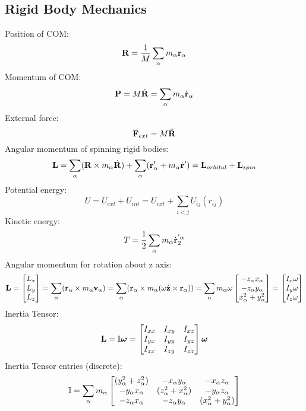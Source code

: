 \subsection{Rigid Body Mechanics}
Position of COM:
\begin{equation}
    \mathbf{R} = \frac{1}{M}\sum_\alpha m_\alpha\mathbf{r}_\alpha
\end{equation}
Momentum of COM:
\begin{equation}
    \mathbf{P} = M\dot{\mathbf{R}} = \sum_\alpha m_\alpha \dot{\mathbf{r}}_\alpha
\end{equation}
External force:
\begin{equation}
    \mathbf{F}_{ext} = M\ddot{\mathbf{R}}
\end{equation}
Angular momentum of spinning rigid bodies:
\begin{equation}
    \mathbf{L} = \sum_\alpha (\mathbf{R} \times m_\alpha\dot{\mathbf{R}}) + \sum_\alpha (\mathbf{r}'_\alpha + m_\alpha\dot{\mathbf{r}}') = \mathbf{L}_{orbital} + \mathbf{L}_{spin}
\end{equation}
Potential energy:
\begin{equation}
    U = U_{ext} + U_{int} = U_{ext} + \sum_{i<j}U_{ij}(r_{ij})
\end{equation}
Kinetic energy:
\begin{equation}
    T = \frac{1}{2}\sum_\alpha m_\alpha \dot{\mathbf{r}}^{'\alpha}_2
\end{equation}
Angular momentum for rotation about z axis:
\begin{equation}
    \mathbf{L} = \begin{bmatrix}L_x \\ L_y \\ L_z\end{bmatrix} = \sum_\alpha (\mathbf{r}_{\alpha} \times m_\alpha\mathbf{v}_\alpha) = \sum_\alpha (\mathbf{r}_{\alpha} \times m_\alpha(\omega\hat{\mathbf{z}} \times \mathbf{r}_\alpha)) = \sum_\alpha m_\alpha\omega\begin{bmatrix}-z_\alpha x_\alpha \\ -z_\alpha y_\alpha \\ x_\alpha^2 + y_\alpha^2\end{bmatrix} = \begin{bmatrix}I_x \omega \\ I_{y}\omega \\ I_z \omega\end{bmatrix}
\end{equation}
Inertia Tensor:
\begin{equation}
    \mathbf{L} = \mathbb{I} \bm{\omega} = \begin{bmatrix}I_{xx} & I_{xy} & I_{xz} \\ I_{yx} & I_{yy} & I_{yz} \\ I_{zx} & I_{zy} & I_{zz}\end{bmatrix}\bm{\omega}
\end{equation}
Inertia Tensor entries (discrete):
\[\mathbb{I} = \sum_\alpha m_\alpha \begin{bmatrix}(y_\alpha^2 + z_\alpha^2) & - x_\alpha y_\alpha & -x_\alpha z_\alpha
\\ -y_\alpha x_\alpha & (z_\alpha^2 + x_\alpha^2) & -y_\alpha z_\alpha
\\ -z_\alpha x_\alpha & -z_\alpha y_\alpha & (x_\alpha^2 + y_\alpha^2)\end{bmatrix}\]
